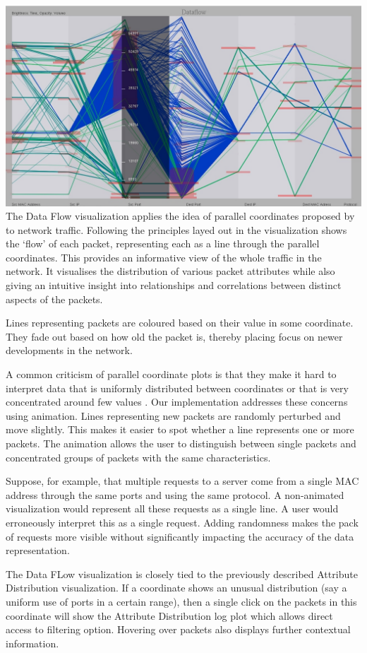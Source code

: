 \includegraphics[width=\linewidth]{materials/dataflow.jpg}
The Data Flow visualization applies the idea of parallel coordinates proposed by \cite{inselberg1985plane} to network traffic. Following the principles layed out in \cite{fliggnetwork} the visualization shows the `flow' of each packet, representing each as a line through the parallel coordinates. This provides an informative view of the whole traffic in the network. It visualises the distribution of various packet attributes while also giving an intuitive insight into relationships and correlations between distinct aspects of the packets.

Lines representing packets are coloured based on their value in some coordinate. They fade out based on how old the packet is, thereby placing focus on newer developments in the network. 

A common criticism of parallel coordinate plots is that they make it hard to interpret data that is uniformly distributed between coordinates or that is very concentrated around few values \cite{marty2009applied}. Our implementation addresses these concerns using animation. Lines representing new packets are randomly perturbed and move slightly. This makes it easier to spot whether a line represents one or more packets. The animation allows the user to distinguish between single packets and concentrated groups of packets with the same characteristics.

Suppose, for example, that multiple requests to a server come from a single MAC address through the same ports and using the same protocol. A non-animated visualization would represent all these requests as a single line. A user would erroneously interpret this as a single request. Adding randomness makes the pack of requests more visible without significantly impacting the accuracy of the data representation.

The Data FLow visualization is closely tied to the previously described Attribute Distribution visualization. If a coordinate shows an unusual distribution (say a uniform use of ports in a certain range), then a single click on the packets in this coordinate will show the Attribute Distribution log plot which allows direct access to filtering option. Hovering over packets also displays further contextual information.